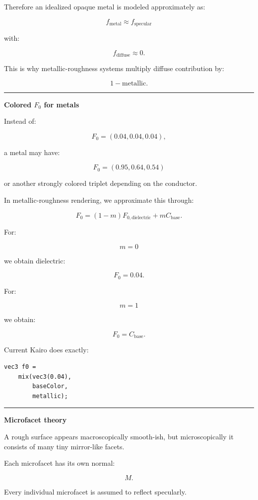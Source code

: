 Therefore an idealized opaque metal is modeled approximately as:

\[
\boxed{
f_{\text{metal}}
\approx
f_{\text{specular}}
}
\]

with:

\[
f_{\text{diffuse}}\approx0.
\]

This is why metallic-roughness systems multiply diffuse contribution by:

\[
1-\text{metallic}.
\]

\begin{center}\rule{0.5\linewidth}{0.5pt}\end{center}

\textbf{Colored \(F_0\) for metals}

Instead of:

\[
F_0=(0.04,0.04,0.04),
\]

a metal may have:

\[
F_0=(0.95,0.64,0.54)
\]

or another strongly colored triplet depending on the conductor.

In metallic-roughness rendering, we approximate this through:

\[
\boxed{
F_0=
(1-m)F_{0,\text{dielectric}}
+
mC_{\text{base}}.
}
\]

For:

\[
m=0
\]

we obtain dielectric:

\[
F_0=0.04.
\]

For:

\[
m=1
\]

we obtain:

\[
F_0=C_{\text{base}}.
\]

Current Kairo does exactly:

\begin{verbatim}
vec3 f0 =
    mix(vec3(0.04),
        baseColor,
        metallic);
\end{verbatim}

\begin{center}\rule{0.5\linewidth}{0.5pt}\end{center}

\textbf{Microfacet theory}

A rough surface appears macroscopically smooth-ish, but microscopically it consists of many tiny mirror-like facets.

Each microfacet has its own normal:

\[
M.
\]

Every individual microfacet is assumed to reflect specularly.

